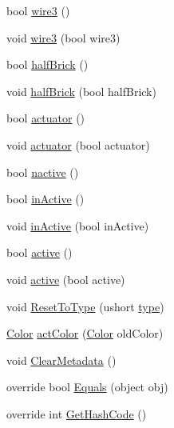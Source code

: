 \begin{DoxyCompactItemize}
bool \hyperlink{class_o_t_a_1_1_memory_1_1_mem_tile_a4c637e48c8f1e2fefd4868ee037cc635}{wire3} ()
\item 
void \hyperlink{class_o_t_a_1_1_memory_1_1_mem_tile_a7dab5007197f2abdb49c890c69de74b9}{wire3} (bool wire3)
\item 
bool \hyperlink{class_o_t_a_1_1_memory_1_1_mem_tile_a96a81bdbac7ddf57877fba747342cf29}{half\+Brick} ()
\item 
void \hyperlink{class_o_t_a_1_1_memory_1_1_mem_tile_a2b70568239cbf5696660d1b6edeaa555}{half\+Brick} (bool half\+Brick)
\item 
bool \hyperlink{class_o_t_a_1_1_memory_1_1_mem_tile_ad685b1857c3fb4d52bf12925c87948e6}{actuator} ()
\item 
void \hyperlink{class_o_t_a_1_1_memory_1_1_mem_tile_a2ec8e44e4235fb126803d2363b8d1b0f}{actuator} (bool actuator)
\item 
bool \hyperlink{class_o_t_a_1_1_memory_1_1_mem_tile_ac0c294941cb26d31c5bd9f24f21024f0}{nactive} ()
\item 
bool \hyperlink{class_o_t_a_1_1_memory_1_1_mem_tile_a42125e98a2ae1b5a3698f9d9b5de8733}{in\+Active} ()
\item 
void \hyperlink{class_o_t_a_1_1_memory_1_1_mem_tile_ab8d248c9121fa974578c1134ac501bba}{in\+Active} (bool in\+Active)
\item 
bool \hyperlink{class_o_t_a_1_1_memory_1_1_mem_tile_afb456f2f5528fb391cb17c9185b995a6}{active} ()
\item 
void \hyperlink{class_o_t_a_1_1_memory_1_1_mem_tile_ace83da35c972f5a00d18d047259fa6c8}{active} (bool active)
\item 
void \hyperlink{class_o_t_a_1_1_memory_1_1_mem_tile_a1d5cfc51926b9232e94264ed92a2019a}{Reset\+To\+Type} (ushort \hyperlink{class_o_t_a_1_1_memory_1_1_mem_tile_a1ba0b20369ea76b26ee3402c879e4809}{type})
\item 
\hyperlink{struct_microsoft_1_1_xna_1_1_framework_1_1_color}{Color} \hyperlink{class_o_t_a_1_1_memory_1_1_mem_tile_acb58462153bfcfe0c006eddeaf269aa8}{act\+Color} (\hyperlink{struct_microsoft_1_1_xna_1_1_framework_1_1_color}{Color} old\+Color)
\item 
void \hyperlink{class_o_t_a_1_1_memory_1_1_mem_tile_a80c8f9fd30328f64a051ef7692bd2e0d}{Clear\+Metadata} ()
\item 
override bool \hyperlink{class_o_t_a_1_1_memory_1_1_mem_tile_a04c1605ebf9df6fa6a7b4cda843e56dc}{Equals} (object obj)
\item 
override int \hyperlink{class_o_t_a_1_1_memory_1_1_mem_tile_ac34d2141f9b1dc53cfe060737a28f033}{Get\+Hash\+Code} ()
\end{DoxyCompactItemize}

